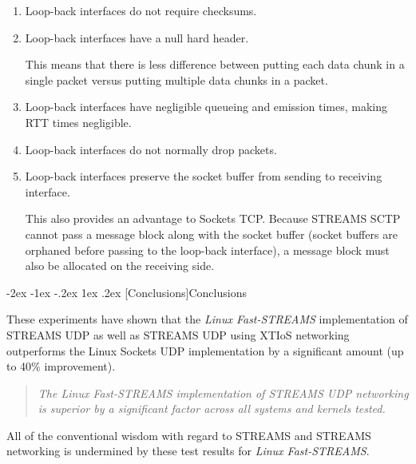 \documentclass[letterpaper,final,notitlepage,twocolumn,10pt,twoside]{article}
\makeatletter
\renewcommand\section{\@startsection {section}{1}{\z@}%
                                   {-2ex \@plus -1ex \@minus -.2ex}%
                                   {1ex \@plus .2ex}%
                                   {\normalfont\large\bfseries}}
\renewcommand\subsubsection{\@startsection{subsubsection}{3}{\z@}%
                                     {-1.25ex\@plus -.5ex \@minus -.2ex}%
                                     {1ex \@plus .2ex}%
                                     {\normalfont\normalsize\bfseries}}
\makeatother
\begin{document}
\begin{enumerate}

\item Loop-back interfaces do not require checksums.

\item Loop-back interfaces have a null hard header.

This means that there is less difference between putting each data chunk in a single packet versus
putting multiple data chunks in a packet.

\item Loop-back interfaces have negligible queueing and emission times, making RTT times negligible.

\item Loop-back interfaces do not normally drop packets.

\item Loop-back interfaces preserve the socket buffer from sending to receiving interface.

This also provides an advantage to Sockets TCP.  Because STREAMS SCTP cannot pass a message block
along with the socket buffer (socket buffers are orphaned before passing to the loop-back
interface), a message block must also be allocated on the receiving side.

\end{enumerate}


\section[Conclusions]{Conclusions}

These experiments have shown that the \textsl{Linux Fast-STREAMS} implementation of STREAMS UDP
as well as STREAMS UDP using XTIoS networking outperforms the Linux Sockets UDP implementation by a
significant amount (up to 40\% improvement).

\begin{quote}
\textit{The \textsl{Linux Fast-STREAMS} implementation of STREAMS UDP networking is
superior by a significant factor across all systems and kernels tested.}
\end{quote}

All of the conventional wisdom with regard to STREAMS and STREAMS networking is undermined by these
test results for \textsl{Linux Fast-STREAMS}.
\end{document}
